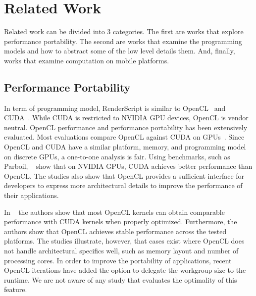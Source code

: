 \section{Related Work}
\label{sec:related}

Related work can be divided into $3$ categories.  The first are works that
explore performance portability.  The second are works that examine the
programming models and how to abstract some of the low level details them.  And,
finally, works that examine computation on mobile platforms.

\subsection{Performance Portability}

In term of programming model, RenderScript is similar to OpenCL~\cite{OpenCL}
and CUDA~\cite{CUDA:Programming-Guide}. While CUDA is restricted to NVIDIA GPU
devices, OpenCL is vendor neutral. OpenCL performance and performance
portability has been extensively evaluated.  Most evaluations compare OpenCL
against CUDA on GPUs~\cite{fang2011comprehensive, weber2011comparing,
van2011correlating, vassilev2010comparison, amorim2009comparing,
karimi2010performance, komatsu2010evaluating}.  Since OpenCL and CUDA have a
similar platform, memory, and programming model on discrete GPUs, a one-to-one
analysis is fair.  Using benchmarks, such as Parboil, ~\cite{weber2011comparing,
van2011correlating, vassilev2010comparison, amorim2009comparing} show that on
NVIDIA GPUs, CUDA achieves better performance than OpenCL.  The studies also
show that OpenCL provides a sufficient interface for developers to express more
architectural details to improve the performance of their applications. 

In ~\cite{komatsu2010evaluating,fang2011comprehensive,dolbeau2013one} the
authors show that most OpenCL kernels can obtain comparable performance with
CUDA kernels when properly optimized.  Furthermore, the authors show that OpenCL
achieves stable performance across the tested platforms. The studies illustrate,
however, that cases exist where OpenCL does not handle architectural specifics
well, such as memory layout and number of processing cores. In order to improve
the portability of applications, recent OpenCL iterations have added the option
to delegate the workgroup size to the runtime.  We are not aware of any study
that evaluates the optimality of this feature.



